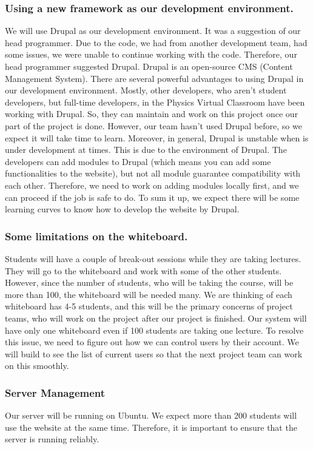 \documentclass[10pt]{article}
\begin{document}
        \subsubsection{Using a new framework as our development environment.}
            We will use Drupal as our development environment. It was a suggestion of our head programmer. Due to the code, we had from another development team, had some issues, we were unable to continue working with the code. Therefore, our head programmer suggested Drupal. Drupal is an open-source CMS (Content Management System). There are several powerful advantages to using Drupal in our development environment. Mostly, other developers, who aren’t student developers, but full-time developers, in the Physics Virtual Classroom have been working with Drupal. So, they can maintain and work on this project once our part of the project is done. However, our team hasn’t used Drupal before, so we expect it will take time to learn. Moreover, in general, Drupal is unstable when is under development at times. This is due to the environment of Drupal. The developers can add modules to Drupal (which means you can add some functionalities to the website), but not all module guarantee compatibility with each other. Therefore, we need to work on adding modules locally first, and we can proceed if the job is safe to do. To sum it up, we expect there will be some learning curves to know how to develop the website by Drupal.

        \subsubsection{Some limitations on the whiteboard.}
            Students will have a couple of break-out sessions while they are taking lectures. They will go to the whiteboard and work with some of the other students. However, since the number of students, who will be taking the course, will be more than 100, the whiteboard will be needed many. We are thinking of each whiteboard has 4-5 students, and this will be the primary concerns of project teams, who will work on the project after our project is finished. Our system will have only one whiteboard even if 100 students are taking one lecture. To resolve this issue, we need to figure out how we can control users by their account. We will build to see the list of current users so that the next project team can work on this smoothly.

        \subsubsection{Server Management}
            Our server will be running on Ubuntu. We expect more than 200 students will use the website at the same time. Therefore, it is important to ensure that the server is running reliably.
\end{document}
